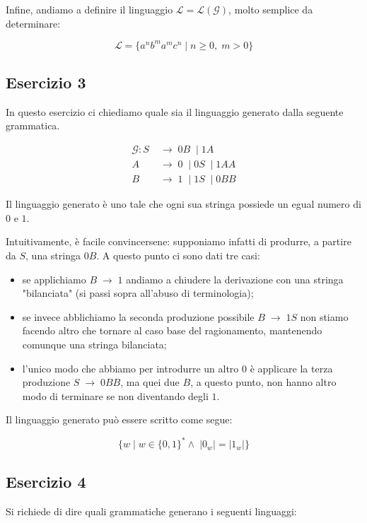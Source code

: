 \documentclass[class=book, crop=false, oneside, 12pt]{standalone}
\begin{document}
\noindent Infine, andiamo a definire il linguaggio \(\mathcal{L = L(G)}\), molto semplice da determinare:

\begin{equation*}
  \mathcal{L} = \{ a^n b^m a^m c^n \mid n \geq 0,\; m > 0 \}
\end{equation*}

\subsection*{Esercizio 3}
In questo esercizio ci chiediamo quale sia il linguaggio generato dalla seguente grammatica.

\begin{align*}
  \mathcal{G}: S\; &\to\; 0B\; \mid 1A \\
  A\; &\to\; 0\; \mid 0S\; \mid 1AA \\
  B\; &\to\; 1\; \mid 1S\; \mid 0BB
\end{align*}

\noindent Il linguaggio generato è uno tale che ogni sua stringa possiede un egual numero di \(0\) e \(1\).

Intuitivamente, è facile convincersene: supponiamo infatti di produrre, a partire da \(S\), una stringa \(0B\). A questo punto ci sono dati tre casi:

\begin{itemize}
  \item se applichiamo \(B\; \to\; 1\) andiamo a chiudere la derivazione con una stringa "bilanciata" (si passi sopra all'abuso di terminologia);
  \item se invece abblichiamo la seconda produzione possibile \(B\; \to\; 1S\) non stiamo facendo altro che tornare al caso base del ragionamento, mantenendo comunque una stringa bilanciata;
  \item l'unico modo che abbiamo per introdurre un altro \(0\) è applicare la terza produzione \(S\; \to\; 0BB\), ma quei due \(B\), a questo punto, non hanno altro modo di terminare se non diventando degli \(1\).
\end{itemize}

\noindent Il linguaggio generato può essere scritto come segue:

\begin{equation*}
  \{ w \mid w \in \{0, 1\}^* \land\; |0_w| = |1_w| \}
\end{equation*}

\subsection*{Esercizio 4}
Si richiede di dire quali grammatiche generano i seguenti linguaggi:
\end{document}
